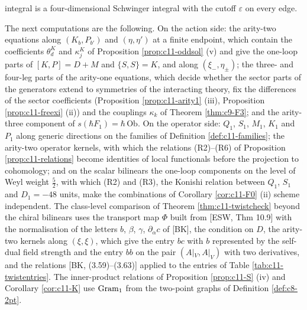 \begin{remark}
integral is a four-dimensional Schwinger integral with the cutoff $\varepsilon$ on every edge.
\end{remark}

\begin{remark}
\label{rem:c11-next}
The next computations are the following. On the action side: the arity-two equations along $(K_b,P_{b'})$ and $(\eta,\eta')$ at a finite endpoint, which contain the coefficients $\theta^K_d$ and $\kappa^K_j$ of Proposition \ref{prop:c11-oddsol} (v) and give the one-loop parts of $[K,P]=D+M$ and $\{S,S\}=K$, and along $(\xi_-,\eta_\pm)$; the three- and four-leg parts of the arity-one equations, which decide whether the sector parts of the generators extend to symmetries of the interacting theory, fix the differences of the sector coefficients (Proposition \ref{prop:c11-arity1} (iii), Proposition \ref{prop:c11-freexi} (ii)) and the couplings $\kappa_k$ of Theorem \ref{thm:c9-F3}; and the arity-three component of $s(\hbar F_1)=\hbar\,\mathrm{Ob}$. On the operator side: $Q_1$, $S_1$, $M_1$, $K_1$ and $P_1$ along generic directions on the families of Definition \ref{def:c11-families}; the arity-two operator kernels, with which the relations (R2)--(R6) of Proposition \ref{prop:c11-relations} become identities of local functionals before the projection to cohomology; and on the scalar bilinears the one-loop components on the level of Weyl weight $\tfrac52$, with which (R2) and (R3), the Konishi relation between $Q_1$, $S_1$ and $D_1=-48$ units, make the combinations of Corollary \ref{cor:c11-F0} (ii) scheme independent. The class-level comparison of Theorem \ref{thm:c11-twistcheck} beyond the chiral bilinears uses the transport map $\Phi$ built from [ESW, Thm 10.9] with the normalisation of the letters $b$, $\beta$, $\gamma$, $\partial_{\dot\alpha}c$ of [BK], the condition on $D$, the arity-two kernels along $(\xi,\xi)$, which give the entry $bc$ with $b$ represented by the self-dual field strength and the entry $bb$ on the pair $(A|_V,A|_V)$ with two derivatives, and the relations [BK, (3.59)--(3.63)] applied to the entries of Table \ref{tab:c11-twistentries}. The inner-product relations of Proposition \ref{prop:c11-S} (iv) and Corollary \ref{cor:c11-K} use $\mathrm{Gram}_{\rm 1}$ from the two-point graphs of Definition \ref{def:c8-2pt}.
\end{remark}

